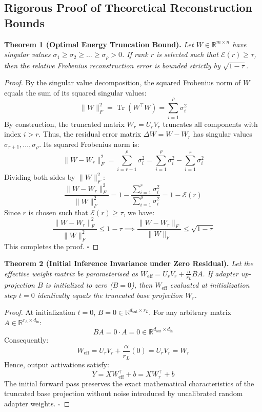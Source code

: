 \subsection{Rigorous Proof of Theoretical Reconstruction Bounds}

\textbf{Theorem 1 (Optimal Energy Truncation Bound).} \textit{Let $W \in \mathbb{R}^{m \times n}$ have singular values $\sigma_1 \ge \sigma_2 \ge \dots \ge \sigma_{\rho} > 0$. If rank $r$ is selected such that $\mathcal{E}(r) \ge \tau$, then the relative Frobenius reconstruction error is bounded strictly by $\sqrt{1 - \tau}$.}

\begin{proof}
By the singular value decomposition, the squared Frobenius norm of $W$ equals the sum of its squared singular values:
\[
\|W\|_F^2 = \operatorname{Tr}(W^\top W) = \sum_{i=1}^{\rho} \sigma_i^2
\]
By construction, the truncated matrix $W_r = U_r V_r$ truncates all components with index $i > r$. Thus, the residual error matrix $\Delta W = W - W_r$ has singular values $\sigma_{r+1}, \dots, \sigma_{\rho}$.
Its squared Frobenius norm is:
\[
\|W - W_r\|_F^2 = \sum_{i=r+1}^{\rho} \sigma_i^2 = \sum_{i=1}^{\rho} \sigma_i^2 - \sum_{i=1}^{r} \sigma_i^2
\]
Dividing both sides by $\|W\|_F^2$:
\[
\frac{\|W - W_r\|_F^2}{\|W\|_F^2} = 1 - \frac{\sum_{i=1}^{r} \sigma_i^2}{\sum_{i=1}^{\rho} \sigma_i^2} = 1 - \mathcal{E}(r)
\]
Since $r$ is chosen such that $\mathcal{E}(r) \ge \tau$, we have:
\[
\frac{\|W - W_r\|_F^2}{\|W\|_F^2} \le 1 - \tau \implies \frac{\|W - W_r\|_F}{\|W\|_F} \le \sqrt{1 - \tau}
\]
This completes the proof. $\square$
\end{proof}

\textbf{Theorem 2 (Initial Inference Invariance under Zero Residual).} \textit{Let the effective weight matrix be parameterised as $W_{\text{eff}} = U_r V_r + \frac{\alpha}{r_L} B A$. If adapter up-projection $B$ is initialized to zero ($B = 0$), then $W_{\text{eff}}$ evaluated at initialization step $t=0$ identically equals the truncated base projection $W_r$.}

\begin{proof}
At initialization $t=0$, $B = 0 \in \mathbb{R}^{d_{\text{out}} \times r_L}$. For any arbitrary matrix $A \in \mathbb{R}^{r_L \times d_{\text{in}}}$:
\[
B A = 0 \cdot A = 0 \in \mathbb{R}^{d_{\text{out}} \times d_{\text{in}}}
\]
Consequently:
\[
W_{\text{eff}} = U_r V_r + \frac{\alpha}{r_L} (0) = U_r V_r = W_r
\]
Hence, output activations satisfy:
\[
Y = X W_{\text{eff}}^\top + b = X W_r^\top + b
\]
The initial forward pass preserves the exact mathematical characteristics of the truncated base projection without noise introduced by uncalibrated random adapter weights. $\square$
\end{proof}
